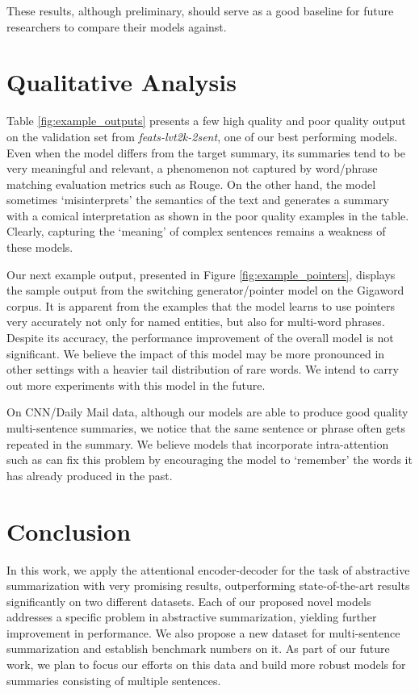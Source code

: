 These results, although preliminary, should serve as a good baseline for future researchers to compare their models against. 

\section{Qualitative Analysis}\label{sec:analysis}

Table \ref{fig:example_outputs} presents a few high quality and poor quality output on the validation set from {\it feats-lvt2k-2sent}, one of our best performing models. Even when the model differs from the target summary, its summaries tend to be very meaningful and relevant, a phenomenon not captured by word/phrase matching evaluation metrics such as Rouge. On the other hand, the model sometimes `misinterprets' the semantics of the text and generates a summary with a comical interpretation as shown in the poor quality examples in the table. Clearly, capturing the `meaning' of complex sentences remains a weakness of these models.

Our next example output, presented in Figure \ref{fig:example_pointers}, displays the sample output from the switching generator/pointer model on the Gigaword corpus. It is apparent from the examples that the model learns to use pointers very accurately not only for named entities, but also for multi-word phrases. Despite its accuracy, the performance improvement of the overall model is not significant. We believe the impact of this model may be more pronounced in other settings with a heavier tail distribution of rare words. We intend to carry out more experiments with this model in the future.

On CNN/Daily Mail data, although our models are able to produce good quality multi-sentence summaries, we notice that the same sentence or phrase often gets repeated in the summary. We believe models that incorporate intra-attention such as  can fix this problem by encouraging the model to `remember' the words it has already produced in the past.

\section{Conclusion}\label{sec:conclusion}

In this work, we apply the attentional encoder-decoder for the task of abstractive summarization with very promising results, outperforming state-of-the-art results significantly on two different datasets. Each of our proposed novel models addresses a specific problem in abstractive summarization, yielding further improvement in performance. We also propose a new dataset for multi-sentence summarization and establish benchmark numbers on it. As part of our future work, we plan to focus our efforts on this data and build more robust models for summaries consisting of multiple sentences.


